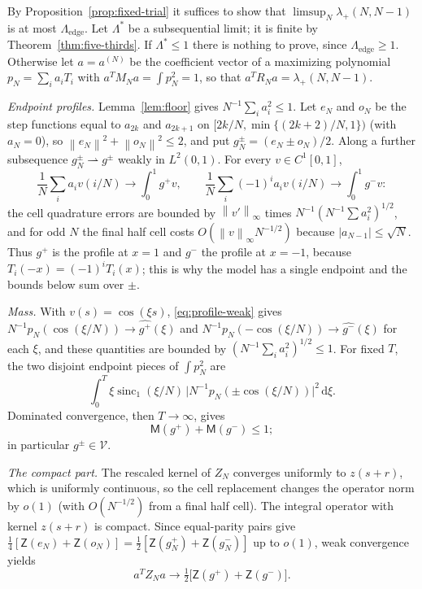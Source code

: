 \documentclass{siamart251216}
\newcommand{\norm}[1]{\left\lVert#1\right\rVert}
\newcommand{\dd}{\,\mathrm d}
\begin{document}
By Proposition~\ref{prop:fixed-trial} it suffices to show that
$\limsup_N\lambda_+(N,N-1)$ is at most $\Lambda_{\mathrm{edge}}$. Let $\Lambda^*$ be a
subsequential limit; it is finite by Theorem~\ref{thm:five-thirds}. If
$\Lambda^*\le1$ there is nothing to prove, since $\Lambda_{\mathrm{edge}}\ge1$.
Otherwise let $a=a^{(N)}$ be the coefficient vector of a maximizing
polynomial $p_N=\sum_ia_iT_i$ with $a^TM_Na=\int p_N^2=1$, so that
$a^TR_Na=\lambda_+(N,N-1)$.

\emph{Endpoint profiles.} Lemma~\ref{lem:floor} gives
$N^{-1}\sum_ia_i^2\le1$. Let $e_N$ and $o_N$ be the step functions equal to
$a_{2k}$ and $a_{2k+1}$ on $[2k/N,\min\{(2k+2)/N,1\})$ (with $a_N=0$), so
$\norm{e_N}^2+\norm{o_N}^2\le2$, and put $g_N^\pm=(e_N\pm o_N)/2$. Along a
further subsequence $g_N^\pm\rightharpoonup g^\pm$ weakly in $L^2(0,1)$.
For every $v\in C^1[0,1]$,
\begin{equation}\label{eq:profile-weak}
 \frac1N\sum_ia_iv(i/N)\to\int_0^1g^+v,\qquad
 \frac1N\sum_i(-1)^ia_iv(i/N)\to\int_0^1g^-v :
\end{equation}
the cell quadrature errors are bounded by $\norm{v'}_\infty$ times
$N^{-1}(N^{-1}\sum a_i^2)^{1/2}$, and for odd $N$ the final half cell costs
$O(\norm v_\infty N^{-1/2})$ because $|a_{N-1}|\le\sqrt N$. Thus $g^+$ is the
profile at $x=1$ and $g^-$ the profile at $x=-1$, because
$T_i(-x)=(-1)^iT_i(x)$; this is why the model has a single endpoint and the
bounds below sum over $\pm$.

\emph{Mass.} With $v(s)=\cos(\xi s)$, \eqref{eq:profile-weak} gives
$N^{-1}p_N(\cos(\xi/N))\to\widehat{g^+}(\xi)$ and
$N^{-1}p_N(-\cos(\xi/N))\to\widehat{g^-}(\xi)$ for each $\xi$, and these
quantities are bounded by $(N^{-1}\sum_ia_i^2)^{1/2}\le1$. For fixed $T$,
the two disjoint endpoint pieces of $\int p_N^2$ are
\[
 \int_0^T\xi\operatorname{sinc}_1(\xi/N)\,\bigl|N^{-1}p_N(\pm\cos(\xi/N))\bigr|^2\dd\xi .
\]
Dominated convergence, then $T\to\infty$, gives
\begin{equation}\label{eq:profile-mass}
 \mathsf M(g^+)+\mathsf M(g^-)\le1 ;
\end{equation}
in particular $g^\pm\in\mathcal V$.

\emph{The compact part.} The rescaled kernel of $Z_N$ converges uniformly to
$z(s+r)$, which is uniformly continuous, so the cell replacement changes the
operator norm by $o(1)$ (with $O(N^{-1/2})$ from a final half cell). The
integral operator with kernel $z(s+r)$ is compact. Since equal-parity pairs
give $\frac14[\mathsf Z(e_N)+\mathsf Z(o_N)]=\frac12[\mathsf Z(g_N^+)+\mathsf Z(g_N^-)]$
up to $o(1)$, weak convergence yields
\[
 a^TZ_Na\to\tfrac12\bigl[\mathsf Z(g^+)+\mathsf Z(g^-)\bigr].
\]
\end{document}
